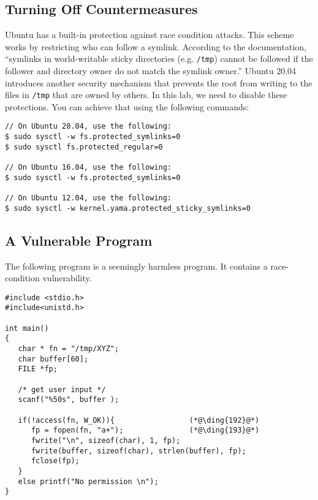 \subsection{Turning Off Countermeasures}

Ubuntu has a built-in protection against race condition 
attacks. This scheme works by restricting who can follow a symlink. 
According to the documentation, ``symlinks in world-writable sticky 
directories (e.g. {\tt /tmp}) cannot be followed if the follower and directory 
owner do not match the symlink owner.''
Ubuntu 20.04 introduces another security mechanism that prevents the root 
from writing to the files in \texttt{/tmp} that are owned by others.  
In this lab, we need to disable these protections. You can achieve
that using the following commands:

\begin{lstlisting}
// On Ubuntu 20.04, use the following:
$ sudo sysctl -w fs.protected_symlinks=0
$ sudo sysctl fs.protected_regular=0

// On Ubuntu 16.04, use the following:
$ sudo sysctl -w fs.protected_symlinks=0

// On Ubuntu 12.04, use the following:
$ sudo sysctl -w kernel.yama.protected_sticky_symlinks=0
\end{lstlisting}


\subsection{A Vulnerable Program}


The following program is a seemingly harmless program. It contains a race-condition
vulnerability. 

\begin{lstlisting}[caption={The vulnerable program (\texttt{vulp.c})}]
#include <stdio.h>
#include<unistd.h>

int main()
{
   char * fn = "/tmp/XYZ";
   char buffer[60];
   FILE *fp;

   /* get user input */
   scanf("%50s", buffer );

   if(!access(fn, W_OK)){                 (*@\ding{192}@*)
      fp = fopen(fn, "a+");               (*@\ding{193}@*)
      fwrite("\n", sizeof(char), 1, fp);
      fwrite(buffer, sizeof(char), strlen(buffer), fp);
      fclose(fp);
   }
   else printf("No permission \n");
}
\end{lstlisting}

